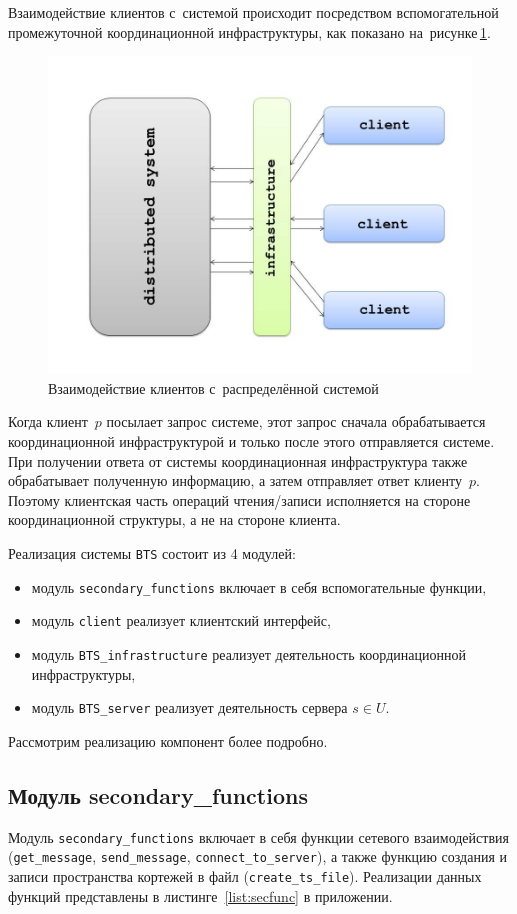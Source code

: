 Взаимодействие клиентов с~системой происходит посредством вспомогательной промежуточной координационной инфраструктуры, как показано на~рисунке\,\ref{clser}.
\begin{figure}[H]
	\centering \includegraphics[width=0.7 \textwidth, height=0.5 \textwidth]{img/ClientServer}  \caption{Взаимодействие клиентов с~распределённой системой} \label{clser}
\end{figure}
Когда клиент~$p$ посылает запрос системе, этот запрос сначала обрабатывается координационной инфраструктурой и только после этого отправляется системе. При получении ответа от системы координационная инфраструктура также обрабатывает полученную информацию, а затем отправляет ответ клиенту~$p$. Поэтому клиентская часть операций чтения/записи исполняется на стороне координационной структуры, а не на стороне клиента.

Реализация системы \texttt{BTS} состоит из 4 модулей:
\begin{itemize}
	\item модуль \texttt{secondary\_functions} включает в себя вспомогательные функции,
	\item модуль \texttt{client} реализует клиентский интерфейс,
	\item модуль \texttt{BTS\_infrastructure} реализует деятельность координационной инфраструктуры,
	\item модуль \texttt{BTS\_server} реализует деятельность сервера $s \in U$.
\end{itemize}
Рассмотрим реализацию компонент более подробно.

\subsection{Модуль secondary\_functions}\label{subsec:2}
Модуль \texttt{secondary\_functions} включает в себя функции сетевого взаимодействия (\texttt{get_message}, \texttt{send_message}, \texttt{connect_to_server}), а также функцию создания и записи пространства кортежей в файл (\texttt{create_ts_file}). Реализации данных функций представлены в листинге~\ref{list:secfunc} в приложении.

